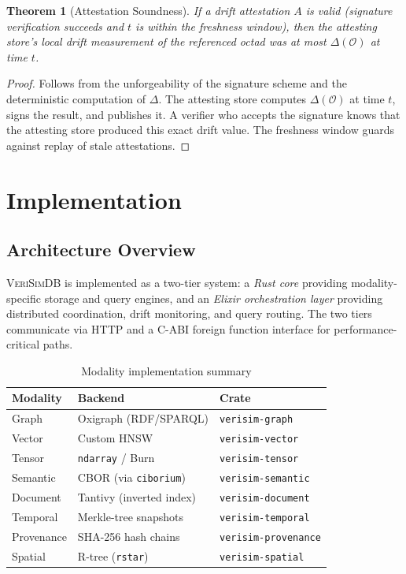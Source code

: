 \documentclass[11pt,twocolumn]{article}
\newtheorem{theorem}{Theorem}[section]
\newcommand{\verisimdb}{\textsc{VeriSimDB}\xspace}
\newcommand{\octad}{\mathcal{O}}
\newcommand{\driftfn}{\Delta}
\begin{document}
\begin{theorem}[Attestation Soundness]\label{thm:attestation}
If a drift attestation $A$ is valid (signature verification succeeds and
$t$ is within the freshness window), then the attesting store's local
drift measurement of the referenced octad was at most $\driftfn(\octad)$
at time $t$.
\end{theorem}

\begin{proof}
Follows from the unforgeability of the signature scheme and the
deterministic computation of $\driftfn$.  The attesting store computes
$\driftfn(\octad)$ at time $t$, signs the result, and publishes it.
A verifier who accepts the signature knows that the attesting store
produced this exact drift value.  The freshness window guards against
replay of stale attestations.
\end{proof}

\section{Implementation}\label{sec:implementation}

\subsection{Architecture Overview}

\verisimdb is implemented as a two-tier system: a \emph{Rust core} providing
modality-specific storage and query engines, and an \emph{Elixir orchestration
layer} providing distributed coordination, drift monitoring, and query
routing.  The two tiers communicate via HTTP and a C-ABI foreign function
interface for performance-critical paths.

\begin{table}[t]
\centering
\caption{Modality implementation summary}\label{tab:impl}
\begin{tabularx}{\columnwidth}{@{}lXl@{}}
\toprule
\textbf{Modality} & \textbf{Backend} & \textbf{Crate} \\
\midrule
Graph     & Oxigraph (RDF/SPARQL)      & \texttt{verisim-graph} \\
Vector    & Custom HNSW                & \texttt{verisim-vector} \\
Tensor    & \texttt{ndarray} / Burn    & \texttt{verisim-tensor} \\
Semantic  & CBOR (via \texttt{ciborium}) & \texttt{verisim-semantic} \\
Document  & Tantivy (inverted index)   & \texttt{verisim-document} \\
Temporal  & Merkle-tree snapshots      & \texttt{verisim-temporal} \\
Provenance & SHA-256 hash chains       & \texttt{verisim-provenance} \\
Spatial   & R-tree (\texttt{rstar})    & \texttt{verisim-spatial} \\
\bottomrule
\end{tabularx}
\end{table}
\end{document}
